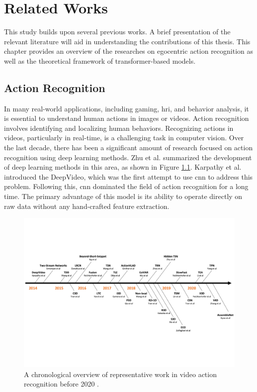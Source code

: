 \chapter{Related Works}
\label{chap:related works}
This study builds upon several previous works. A brief presentation of the relevant literature will aid in understanding the contributions of this thesis. This chapter provides an overview of the researches on egocentric action recognition as well as the theoretical framework of transformer-based models.

\section{Action Recognition}
\label{ar}
In many real-world applications, including gaming, \gls{hri}, and behavior analysis, it is essential to understand human actions in images or videos. Action recognition  involves identifying and localizing human behaviors. Recognizing actions in videos, particularly in real-time, is a challenging task in computer vision. Over the last decade, there has been a significant amount of research focused on action recognition using deep learning methods. Zhu et al. \cite{zhu2020comprehensive} summarized the development of deep learning methods in this area, as shown in Figure \ref{fig:summery_ar}. Karpathy et al. \cite{karpathy_large-scale_2014} introduced the DeepVideo, which was the first attempt to use \gls{cnn} to address this problem. Following this, \gls{cnn} dominated the field of action recognition for a long time. The primary advantage of this model is its ability to operate directly on raw data without any hand-crafted feature extraction.
\begin{figure}[htbp]
    \centering
    \includegraphics[width=\textwidth]{graphics/summery_ar.pdf}
    \caption{A chronological overview of representative work in video action recognition before 2020 \cite{zhu2020comprehensive}.}
    \label{fig:summery_ar}
\end{figure}

